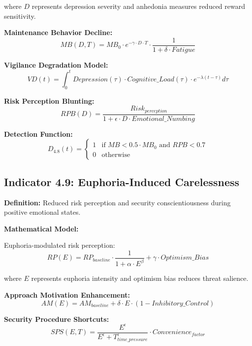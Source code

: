 \documentclass[11pt,a4paper]{article}
\begin{document}
where $D$ represents depression severity and anhedonia measures reduced reward sensitivity.

\textbf{Maintenance Behavior Decline:}
\begin{equation}
MB(D,T) = MB_0 \cdot e^{-\gamma \cdot D \cdot T} \cdot \frac{1}{1 + \delta \cdot Fatigue}
\end{equation}

\textbf{Vigilance Degradation Model:}
\begin{equation}
VD(t) = \int_0^t Depression(\tau) \cdot Cognitive\_Load(\tau) \cdot e^{-\lambda(t-\tau)} d\tau
\end{equation}

\textbf{Risk Perception Blunting:}
\begin{equation}
RPB(D) = \frac{Risk_{perception}}{1 + \epsilon \cdot D \cdot Emotional\_Numbing}
\end{equation}

\textbf{Detection Function:}
\begin{equation}
D_{4.8}(t) = \begin{cases}
1 & \text{if } MB < 0.5 \cdot MB_0 \text{ and } RPB < 0.7 \\
0 & \text{otherwise}
\end{cases}
\end{equation}

\subsection{Indicator 4.9: Euphoria-Induced Carelessness}

\textbf{Definition:} Reduced risk perception and security conscientiousness during positive emotional states.

\textbf{Mathematical Model:}

Euphoria-modulated risk perception:
\begin{equation}
RP(E) = RP_{baseline} \cdot \frac{1}{1 + \alpha \cdot E^{\beta}} + \gamma \cdot Optimism\_Bias
\end{equation}

where $E$ represents euphoria intensity and optimism bias reduces threat salience.

\textbf{Approach Motivation Enhancement:}
\begin{equation}
AM(E) = AM_{baseline} + \delta \cdot E \cdot (1 - Inhibitory\_Control)
\end{equation}

\textbf{Security Procedure Shortcuts:}
\begin{equation}
SPS(E,T) = \frac{E^{\epsilon}}{E^{\epsilon} + T_{time\_pressure}^{\epsilon}} \cdot Convenience_{factor}
\end{equation}
\end{document}
